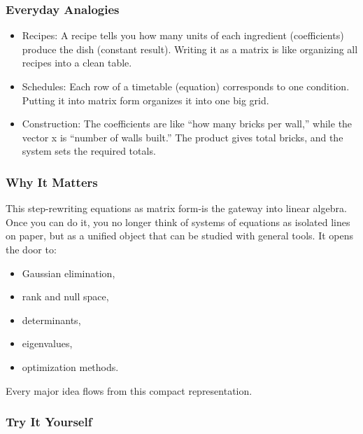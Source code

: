 \documentclass[
  letterpaper,
  DIV=11,
  numbers=noendperiod]{scrreprt}
\providecommand{\tightlist}{%
  \setlength{\itemsep}{0pt}\setlength{\parskip}{0pt}}
\begin{document}
\subsubsection{Everyday Analogies}\label{everyday-analogies-17}

\begin{itemize}
\tightlist
\item
  Recipes: A recipe tells you how many units of each ingredient
  (coefficients) produce the dish (constant result). Writing it as a
  matrix is like organizing all recipes into a clean table.
\item
  Schedules: Each row of a timetable (equation) corresponds to one
  condition. Putting it into matrix form organizes it into one big grid.
\item
  Construction: The coefficients are like ``how many bricks per wall,''
  while the vector x is ``number of walls built.'' The product gives
  total bricks, and the system sets the required totals.
\end{itemize}

\subsubsection{Why It Matters}\label{why-it-matters-17}

This step-rewriting equations as matrix form-is the gateway into linear
algebra. Once you can do it, you no longer think of systems of equations
as isolated lines on paper, but as a unified object that can be studied
with general tools. It opens the door to:

\begin{itemize}
\tightlist
\item
  Gaussian elimination,
\item
  rank and null space,
\item
  determinants,
\item
  eigenvalues,
\item
  optimization methods.
\end{itemize}

Every major idea flows from this compact representation.

\subsubsection{Try It Yourself}\label{try-it-yourself-20}
\end{document}
